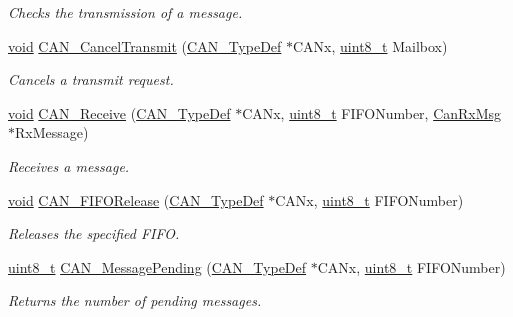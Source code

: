 \begin{DoxyCompactItemize}
\begin{DoxyCompactList}\small\item\em Checks the transmission of a message. \end{DoxyCompactList}\item 
\hyperlink{usb__devapi_8h_afabf60e7f57651d6d595a02c75f07cd0}{void} \hyperlink{group___c_a_n___private___functions_ga81106cdf5395a1947bfc87ec1685829e}{C\+A\+N\+\_\+\+Cancel\+Transmit} (\hyperlink{struct_c_a_n___type_def}{C\+A\+N\+\_\+\+Type\+Def} $\ast$C\+A\+Nx, \hyperlink{_p_e___types_8h_aba7bc1797add20fe3efdf37ced1182c5}{uint8\+\_\+t} Mailbox)
\begin{DoxyCompactList}\small\item\em Cancels a transmit request. \end{DoxyCompactList}\item 
\hyperlink{usb__devapi_8h_afabf60e7f57651d6d595a02c75f07cd0}{void} \hyperlink{group___c_a_n___private___functions_ga351b90bb8a3bb0c846f85bbd56ef4dc8}{C\+A\+N\+\_\+\+Receive} (\hyperlink{struct_c_a_n___type_def}{C\+A\+N\+\_\+\+Type\+Def} $\ast$C\+A\+Nx, \hyperlink{_p_e___types_8h_aba7bc1797add20fe3efdf37ced1182c5}{uint8\+\_\+t} F\+I\+F\+O\+Number, \hyperlink{struct_can_rx_msg}{Can\+Rx\+Msg} $\ast$Rx\+Message)
\begin{DoxyCompactList}\small\item\em Receives a message. \end{DoxyCompactList}\item 
\hyperlink{usb__devapi_8h_afabf60e7f57651d6d595a02c75f07cd0}{void} \hyperlink{group___c_a_n___private___functions_ga1bc3b39471e579b4101624c33d27918b}{C\+A\+N\+\_\+\+F\+I\+F\+O\+Release} (\hyperlink{struct_c_a_n___type_def}{C\+A\+N\+\_\+\+Type\+Def} $\ast$C\+A\+Nx, \hyperlink{_p_e___types_8h_aba7bc1797add20fe3efdf37ced1182c5}{uint8\+\_\+t} F\+I\+F\+O\+Number)
\begin{DoxyCompactList}\small\item\em Releases the specified F\+I\+FO. \end{DoxyCompactList}\item 
\hyperlink{_p_e___types_8h_aba7bc1797add20fe3efdf37ced1182c5}{uint8\+\_\+t} \hyperlink{group___c_a_n___private___functions_ga7100459a95ce1b3cfe8ab15e112029fe}{C\+A\+N\+\_\+\+Message\+Pending} (\hyperlink{struct_c_a_n___type_def}{C\+A\+N\+\_\+\+Type\+Def} $\ast$C\+A\+Nx, \hyperlink{_p_e___types_8h_aba7bc1797add20fe3efdf37ced1182c5}{uint8\+\_\+t} F\+I\+F\+O\+Number)
\begin{DoxyCompactList}\small\item\em Returns the number of pending messages. \end{DoxyCompactList}\item 

\end{DoxyCompactItemize}
